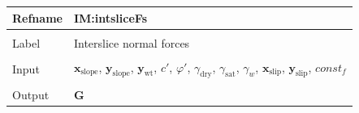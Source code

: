 \documentclass[12pt]{article}
\begin{document}
\vspace{\baselineskip}
\noindent
\begin{minipage}{\textwidth}
\begin{tabular}{>{\raggedright}p{}>{\raggedright\arraybackslash}p{}}
\toprule \textbf{Refname} & \textbf{IM:intsliceFs}
\label{IM:intsliceFs}
\\ \midrule \\
Label & Interslice normal forces
        
\\ \midrule \\
Input & ${\mathbf{x}_{\text{slope}}}$, ${\mathbf{y}_{\text{slope}}}$, ${\mathbf{y}_{\text{wt}}}$, $c'$, $φ'$, ${γ_{\text{dry}}}$, ${γ_{\text{sat}}}$, ${γ_{w}}$, ${\mathbf{x}_{\text{slip}}}$, ${\mathbf{y}_{\text{slip}}}$, $const_f$
        
\\ \midrule \\
Output & $\mathbf{G}$
         

\end{tabular}
\end{minipage}
\end{document}

